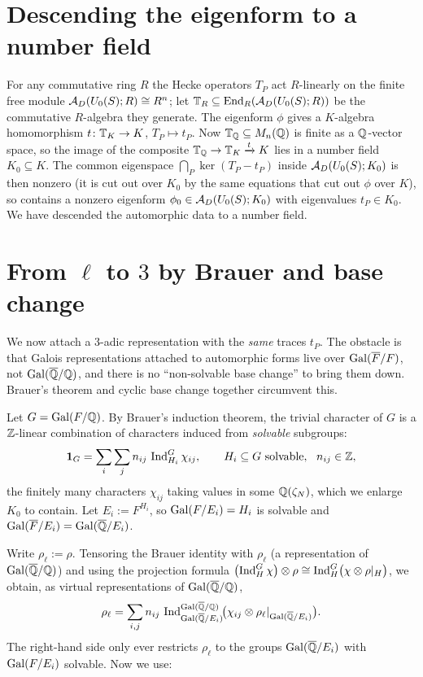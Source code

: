 \documentclass[11pt]{article}
\begin{document}
\section{Descending the eigenform to a number field}

For any commutative ring $R$ the Hecke operators $T_P$ act $R$-linearly on the
finite free module $\mathcal{A}_D(U_0(S);R)\cong R^n$; let $\mathbb{T}_R\subseteq
\operatorname{End}_R(\mathcal{A}_D(U_0(S);R))$ be the commutative $R$-algebra they generate. The
eigenform $\phi$ gives a $K$-algebra homomorphism $t\colon\mathbb{T}_K\to K$,
$T_P\mapsto t_P$. Now $\mathbb{T}_{\mathbb{Q}}\subseteq M_n(\mathbb{Q})$ is finite as a $\mathbb{Q}$-vector
space, so the image of the composite $\mathbb{T}_{\mathbb{Q}}\to\mathbb{T}_K\xrightarrow{t}K$ lies in a
number field $K_0\subseteq K$. The common eigenspace
$\bigcap_P\ker(T_P-t_P)$ inside $\mathcal{A}_D(U_0(S);K_0)$ is then nonzero (it is cut
out over $K_0$ by the same equations that cut out $\phi$ over $K$), so contains a
nonzero eigenform $\phi_0\in\mathcal{A}_D(U_0(S);K_0)$ with eigenvalues $t_P\in K_0$.
We have descended the automorphic data to a number field.

\section{From $\ell$ to $3$ by Brauer and base change}

We now attach a $3$-adic representation with the \emph{same} traces $t_P$. The
obstacle is that Galois representations attached to automorphic forms live over
$\operatorname{Gal}(\overline{F}/F)$, not $\operatorname{Gal}(\overline{\mathbb{Q}}/\mathbb{Q})$, and there is no ``non-solvable base change'' to bring them
down. Brauer's theorem and cyclic base change together circumvent this.

Let $G=\operatorname{Gal}(F/\mathbb{Q})$. By Brauer's induction theorem, the trivial character of $G$
is a $\mathbb{Z}$-linear combination of characters induced from \emph{solvable}
subgroups:
\[
  \mathbf 1_G=\sum_i\sum_j n_{ij}\,\operatorname{Ind}_{H_i}^{G}\chi_{ij},
  \qquad H_i\subseteq G\text{ solvable},\ \ n_{ij}\in\mathbb{Z},
\]
the finitely many characters $\chi_{ij}$ taking values in some $\mathbb{Q}(\zeta_N)$,
which we enlarge $K_0$ to contain. Let $E_i:=F^{H_i}$, so $\operatorname{Gal}(F/E_i)=H_i$ is
solvable and $\operatorname{Gal}(\overline{F}/E_i)=\operatorname{Gal}(\overline{\mathbb{Q}}/E_i)$.

Write $\rho_\ell:=\rho$. Tensoring the Brauer identity with $\rho_\ell$ (a
representation of $\operatorname{Gal}(\overline{\mathbb{Q}}/\mathbb{Q})$) and using the projection formula
$\bigl(\operatorname{Ind}_{H}^{G}\chi\bigr)\otimes\rho\cong
\operatorname{Ind}_{H}^{G}\bigl(\chi\otimes\rho|_H\bigr)$, we obtain, as virtual
representations of $\operatorname{Gal}(\overline{\mathbb{Q}}/\mathbb{Q})$,
\[
  \rho_\ell=\sum_{i,j} n_{ij}\,
   \operatorname{Ind}_{\operatorname{Gal}(\overline{\mathbb{Q}}/E_i)}^{\operatorname{Gal}(\overline{\mathbb{Q}}/\mathbb{Q})}\!\bigl(\chi_{ij}\otimes\rho_\ell|_{\operatorname{Gal}(\overline{\mathbb{Q}}/E_i)}\bigr).
\]
The right-hand side only ever restricts $\rho_\ell$ to the groups
$\operatorname{Gal}(\overline{\mathbb{Q}}/E_i)$ with $\operatorname{Gal}(F/E_i)$ solvable. Now we use:
\end{document}
